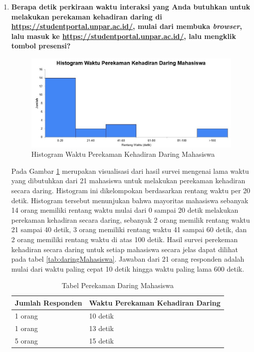 \begin{enumerate}
	\item \textbf{Berapa detik perkiraan waktu interaksi yang Anda butuhkan untuk melakukan perekaman kehadiran daring di \url{https://studentportal.unpar.ac.id/}, mulai dari membuka \textit{browser}, lalu masuk ke \url{https://studentportal.unpar.ac.id/}, lalu mengklik tombol presensi?}
	\begin{figure}[H]
		\centering
		\includegraphics[scale=0.6]{Gambar/DaringMahasiswa.jpg}
		\caption{Histogram Waktu Perekaman Kehadiran Daring Mahasiswa} 
		\label{fig:DaringMahasiswa}
	\end{figure}
	Pada Gambar \ref{fig:DaringMahasiswa} merupakan visualisasi dari hasil survei mengenai lama waktu yang dibutuhkan dari 21 mahasiswa untuk melakukan perekaman kehadiran secara daring. Histogram ini dikelompokan berdasarkan rentang waktu per 20 detik. Histogram tersebut menunjukan bahwa mayoritas mahasiswa sebanyak 14 orang memiliki rentang waktu mulai dari 0 sampai 20 detik melakukan perekaman kehadiran secara daring, sebanyak 2 orang memilik rentang waktu 21 sampai 40 detik, 3 orang memiliki rentang waktu 41 sampai 60 detik, dan 2 orang memiliki rentang waktu di atas 100 detik. Hasil survei perekeman kehadiran secara daring untuk setiap mahasiswa secara jelas dapat dilihat pada tabel \ref{tab:daringMahasiswa}. Jawaban dari 21 orang responden adalah mulai dari waktu paling cepat 10 detik hingga waktu paling lama 600 detik.
	\begin{table}[ht]			
		\caption{Tabel Perekaman Daring Mahasiswa}
		\centering
		\begin{tabular}{|p{4cm} |p{7cm}|}\hline
			Jumlah Responden &  Waktu Perekaman Kehadiran Daring \\ \hline     
			1 orang &  10 detik\\ \hline 
			1 orang &  13 detik\\ \hline 
			5 orang &  15 detik\\ \hline 

\end{tabular}
\end{table}
\end{enumerate}
